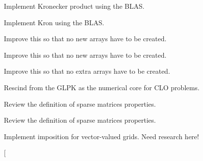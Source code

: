 
\begin{DoxyRefList}
\item[\label{todo__todo000001}%
\hypertarget{todo__todo000001}{}%
Member \hyperlink{classmtk_1_1DenseMatrix_a01d3d8bd502870f93bf3a88a0cc5fb49}{mtk\+:\+:Dense\+Matrix\+:\+:Kron} (const Dense\+Matrix \&aa, const Dense\+Matrix \&bb)]Implement Kronecker product using the B\+L\+A\+S. 

Implement Kron using the B\+L\+A\+S.  
\item[\label{todo__todo000018}%
\hypertarget{todo__todo000018}{}%
Member \hyperlink{classmtk_1_1DenseMatrix_a59b9bea24acf39dca64e8549b3527463}{mtk\+:\+:Dense\+Matrix\+:\+:Order\+Col\+Major} ()]Improve this so that no new arrays have to be created.  
\item[\label{todo__todo000017}%
\hypertarget{todo__todo000017}{}%
Member \hyperlink{classmtk_1_1DenseMatrix_ac2949efba3e8278335d45418c85433e4}{mtk\+:\+:Dense\+Matrix\+:\+:Order\+Row\+Major} ()]Improve this so that no new arrays have to be created.  
\item[\label{todo__todo000016}%
\hypertarget{todo__todo000016}{}%
Member \hyperlink{classmtk_1_1DenseMatrix_a71d9c07ca66e88d97d1fd5012f43138b}{mtk\+:\+:Dense\+Matrix\+:\+:Transpose} ()]Improve this so that no extra arrays have to be created.  
\item[\label{todo__todo000002}%
\hypertarget{todo__todo000002}{}%
Class \hyperlink{classmtk_1_1GLPKAdapter}{mtk\+:\+:G\+L\+P\+K\+Adapter} ]Rescind from the G\+L\+P\+K as the numerical core for C\+L\+O problems.  
\item[\label{todo__todo000026}%
\hypertarget{todo__todo000026}{}%
Member \hyperlink{classmtk_1_1Matrix_af4bba5c43d1f09f5059a04298ba24568}{mtk\+:\+:Matrix\+:\+:Increase\+Num\+Null} () noexcept]Review the definition of sparse matrices properties.  
\item[\label{todo__todo000025}%
\hypertarget{todo__todo000025}{}%
Member \hyperlink{classmtk_1_1Matrix_ace7cb5c31d0de66b8f9c63cd542c9e63}{mtk\+:\+:Matrix\+:\+:Increase\+Num\+Zero} () noexcept]Review the definition of sparse matrices properties.  
\item[\label{todo__todo000029}%
\hypertarget{todo__todo000029}{}%
Member \hyperlink{classmtk_1_1RobinBCDescriptor2D_ac9564bc46c196cbf4720a0e4b93da8b0}{mtk\+:\+:Robin\+B\+C\+Descriptor2\+D\+:\+:Impose\+On\+Grid} (Uni\+Stg\+Grid2\+D \&grid, const Real \&time=k\+Zero) const ]Implement imposition for vector-\/valued grids. Need research here!  
\item[\label{todo__todo000027}%

\end{DoxyRefList}

